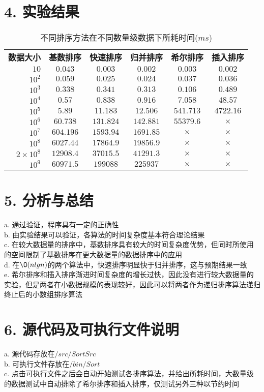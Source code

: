 \documentclass[12pt]{article}
\begin{document}
  \section*{4. 实验结果}
    \begin{table}[h!]
      \begin{center}
        \caption{不同排序方法在不同数量级数据下所耗时间($ms$)}
        \begin{tabular}{r|c|c|c|c|c}
          \toprule
          \textbf{数据大小} & \textbf{基数排序} & \textbf{快速排序} & \textbf{归并排序} & \textbf{希尔排序} & \textbf{插入排序}\\
          $10$ & $0.043$ & $0.003$ & $0.002$ & $0.003$ & $0.002$\\
          $10^2$ & $0.059$ & $0.025$ & $0.024$ & $0.037$ & $0.036$\\
          $10^3$ & $0.338$ & $0.341$ & $0.313$ & $0.106$ & $0.489$\\
          $10^4$ & $0.57$ & $0.838$ & $0.916$ & $7.058$ & $48.57$\\
          $10^5$ & $5.89$ & $11.183$ & $12.506$ & $541.713$ & $4722.16$\\
          $10^6$ & $60.738$ & $131.824$ & $142.881$ & $55379.6$ & $\times$\\
          $10^7$ & $604.196$ & $1593.94$ & $1691.85$ & $\times$ & $\times$\\
          $10^8$ & $6027.44$ & $17864.9$ & $19856.9$ & $\times$ & $\times$\\
          $2\times10^8$ & $12908.4$ & $37015.5$ & $41291.3$ & $\times$ & $\times$\\
          $10^9$ & $60971.5$ & $199088$ & $225937$ & $\times$ & $\times$\\
          \midrule
          \bottomrule
        \end{tabular}
      \end{center}
    \end{table}
  \section*{5. 分析与总结}
  a. 通过验证，程序具有一定的正确性\\
  b. 由实验结果可以验证，各算法的时间复杂度基本符合理论结果\\
  c. 在较大数据量的排序中，基数排序具有较大的时间复杂度优势，但同时所使用的空间限制了基数排序在更大数据量的数据排序中的应用\\
  d. 在$\O(nlgn)$的两个算法中，快速排序明显快于归并排序，这与预期结果一致\\
  e. 希尔排序和插入排序渐进时间复杂度的增长过快，因此没有进行较大数据量的实验，但是两者在小数据规模的表现较好，因此可以将两者作为递归排序算法递归终止后的小数组排序算法
  \section*{6. 源代码及可执行文件说明}
  a. 源代码存放在$/src/SortSrc$\\
  b. 可执行文件存放在$/bin/Sort$\\
  c. 点击可执行文件之后会自动开始测试各排序算法，并给出所耗时间，大数量级的数据测试中自动排除了希尔排序和插入排序，仅测试另外三种以节约时间\\
\end{document}
